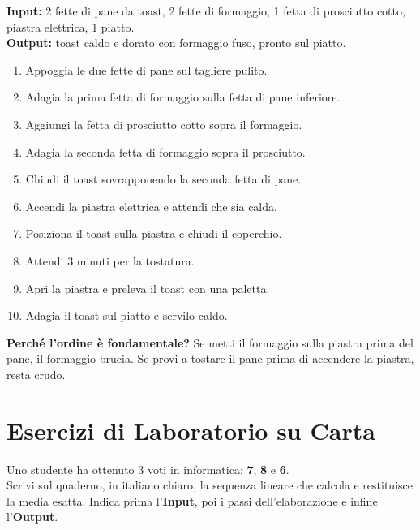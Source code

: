\begin{esempio}
\textbf{Input:} 2 fette di pane da toast, 2 fette di formaggio, 1 fetta di prosciutto cotto, piastra elettrica, 1 piatto.\\
\textbf{Output:} toast caldo e dorato con formaggio fuso, pronto sul piatto.

\begin{enumerate}
  \item Appoggia le due fette di pane sul tagliere pulito.
  \item Adagia la prima fetta di formaggio sulla fetta di pane inferiore.
  \item Aggiungi la fetta di prosciutto cotto sopra il formaggio.
  \item Adagia la seconda fetta di formaggio sopra il prosciutto.
  \item Chiudi il toast sovrapponendo la seconda fetta di pane.
  \item Accendi la piastra elettrica e attendi che sia calda.
  \item Posiziona il toast sulla piastra e chiudi il coperchio.
  \item Attendi 3 minuti per la tostatura.
  \item Apri la piastra e preleva il toast con una paletta.
  \item Adagia il toast sul piatto e servilo caldo.
\end{enumerate}

\textbf{Perché l'ordine è fondamentale?} Se metti il formaggio sulla piastra prima del pane, il formaggio brucia. Se provi a tostare il pane prima di accendere la piastra, resta crudo.
\end{esempio}

\newpage
\section{Esercizi di Laboratorio su Carta}

\begin{esercizio}
Uno studente ha ottenuto 3 voti in informatica: \textbf{7}, \textbf{8} e \textbf{6}.\\
Scrivi sul quaderno, in italiano chiaro, la sequenza lineare che calcola e restituisce la media esatta. Indica prima l'\textbf{Input}, poi i passi dell'elaborazione e infine l'\textbf{Output}.
\end{esercizio}

